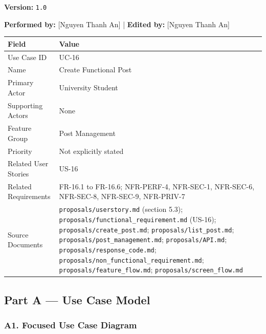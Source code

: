 \documentclass[12pt]{article}
\renewcommand{\baselinestretch}{1.5}
\begin{document}
\textbf{Version:} \texttt{1.0}
\par\medskip

\textbf{Performed by:} [Nguyen Thanh An] | \textbf{Edited by:} [Nguyen Thanh An]
\par\medskip

\begingroup
\small
\renewcommand{\baselinestretch}{1.0}\selectfont
\renewcommand{\arraystretch}{1.15}
\setlength{\tabcolsep}{6pt}
\begin{longtable}{|>{\raggedright\arraybackslash}p{}|>{\raggedright\arraybackslash}p{}|}
\hline
\textbf{Field} & \textbf{Value} \\ \hline
\endhead
Use Case ID & UC-16 \\ \hline
Name & Create Functional Post \\ \hline
Primary Actor & University Student \\ \hline
Supporting Actors & None \\ \hline
Feature Group & Post Management \\ \hline
Priority & Not explicitly stated \\ \hline
Related User Stories & US-16 \\ \hline
Related Requirements & FR-16.1 to FR-16.6; NFR-PERF-4, NFR-SEC-1, NFR-SEC-6, NFR-SEC-8, NFR-SEC-9, NFR-PRIV-7 \\ \hline
Source Documents & \texttt{proposals/userstory.md} (section 5.3); \texttt{proposals/functional\_requirement.md} (US-16); \texttt{proposals/create\_post.md}; \texttt{proposals/list\_post.md}; \texttt{proposals/post\_management.md}; \texttt{proposals/API.md}; \texttt{proposals/response\_code.md}; \texttt{proposals/non\_functional\_requirement.md}; \texttt{proposals/feature\_flow.md}; \texttt{proposals/screen\_flow.md} \\ \hline
\end{longtable}
\endgroup
\par\medskip

\hypertarget{sec:part-a-use-case-model}{}
\subsection*{Part A --- Use Case Model}
\par\medskip

\hypertarget{sec:a1-focused-use-case-diagram}{}
\subsubsection*{A1. Focused Use Case Diagram}
\par\medskip
\end{document}
